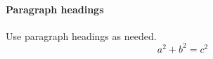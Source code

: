\paragraph{Paragraph headings} Use paragraph headings as needed.
\begin{equation}
a^2+b^2=c^2
\end{equation}

